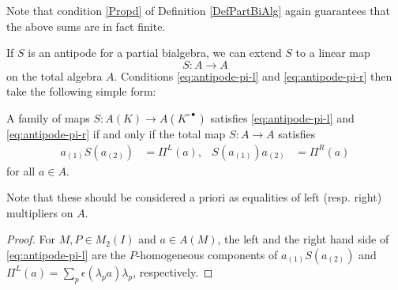 \begin{Rem} Note that condition \ref{Propd} of Definition \ref{DefPartBiAlg} again guarantees that the above sums are in fact finite.
\end{Rem}

If $S$ is an antipode for a partial bialgebra, we can extend $S$ to a
linear map \[S:A\rightarrow A\] on the total algebra $A$.  Conditions
\eqref{eq:antipode-pi-l} and \eqref{eq:antipode-pi-r} then take the
following simple form:
\begin{Lem} \label{lemma:antipode}
  A family of maps $S \colon A(K) \to A(K^{\circ\bullet})$ satisfies
  \eqref{eq:antipode-pi-l} and \eqref{eq:antipode-pi-r} if and only if
  the total map $S\colon A \to A$ satisfies 
  \begin{align} \label{eq:total-antipode}
 a_{(1)}S(a_{(2)}) &= \Pi^{L}(a), &
 S(a_{(1)})a_{(2)} &= \Pi^{R}(a)
  \end{align}
for all $a\in A$.
\end{Lem}

Note that these should be considered a priori as equalities of left (resp. right) multipliers on $A$.

\begin{proof}
For $M,P\in M_{2}(I)$ and $a\in A(M)$, the left and the right hand side  of \eqref{eq:antipode-pi-l} are the $P$-homogeneous components of $ a_{(1)}S(a_{(2)})$ and $\Pi^{L}(a)=\sum_{p} \epsilon(\lambda_{p}a)\lambda_{p}$, respectively.
\end{proof}

